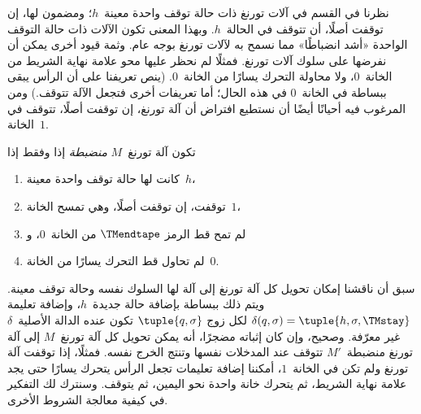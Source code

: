 \documentclass[../../../include/open-logic-section]{subfiles}
\begin{document}

\begin{explain}
نظرنا في القسم  في آلات تورنغ ذات حالة توقف واحدة
معينة~$h$؛ ومضمون لها، إن توقفت أصلًا، أن تتوقف في الحالة~$h$. وبهذا
المعنى تكون الآلات ذات حالة التوقف الواحدة «أشد انضباطًا» مما نسمح به
لآلات تورنغ بوجه عام. وثمة قيود أخرى يمكن أن نفرضها على سلوك آلات
تورنغ. فمثلًا لم نحظر عليها محو علامة نهاية الشريط من الخانة~$0$، ولا
محاولة التحرك يسارًا من الخانة~$0$. (ينص تعريفنا على أن الرأس يبقى
ببساطة في الخانة~$0$ في هذه الحال؛ أما تعريفات أخرى فتجعل الآلة
تتوقف.) ومن المرغوب فيه أحيانًا أيضًا أن نستطيع افتراض أن آلة تورنغ،
إن توقفت أصلًا، تتوقف في الخانة~$1$.
\end{explain}

\begin{defn}
تكون آلة تورنغ~$M$ \emph{منضبطة} إذا وفقط إذا
\begin{enumerate}
    \item كانت لها حالة توقف واحدة معينة~$h$،
    \item توقفت، إن توقفت أصلًا، وهي تمسح الخانة~$1$،
    \item لم تمح قط الرمز $\TMendtape$ من الخانة~$0$، و
    \item لم تحاول قط التحرك يسارًا من الخانة~$0$.
\end{enumerate}
\end{defn}

\begin{explain}
سبق أن ناقشنا إمكان تحويل كل آلة تورنغ إلى آلة لها السلوك نفسه وحالة
توقف معينة. ويتم ذلك ببساطة بإضافة حالة جديدة~$h$، وإضافة تعليمة
$\delta(q,\sigma)=\tuple{h,\sigma,\TMstay}$ لكل زوج
$\tuple{q,\sigma}$ تكون عنده الدالة الأصلية~$\delta$ غير معرّفة.
وصحيح، وإن كان إثباته مضجرًا، أنه يمكن تحويل كل آلة تورنغ~$M$ إلى آلة
تورنغ منضبطة~$M'$ تتوقف عند المدخلات نفسها وتنتج الخرج نفسه. فمثلًا،
إذا توقفت آلة تورنغ ولم تكن في الخانة~$1$، أمكننا إضافة تعليمات تجعل
الرأس يتحرك يسارًا حتى يجد علامة نهاية الشريط، ثم يتحرك خانة واحدة
نحو اليمين، ثم يتوقف. وسنترك لك التفكير في كيفية معالجة الشروط
الأخرى.
\end{explain}
\end{document}
